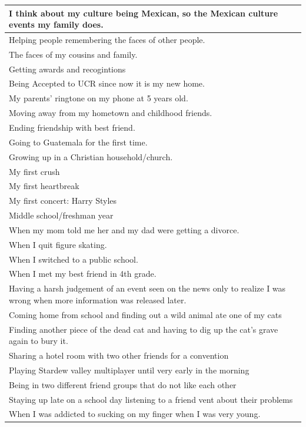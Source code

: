 \documentclass[
  .7em,
  letterpaper,
  DIV=11,
  numbers=noendperiod]{scrartcl}
\begin{document}
\begin{table}
\begin{tabular}{l}
\hline
I think about my culture being Mexican, so the Mexican culture events my family does.\\
\hline
Helping people remembering the faces of other people.\\
\hline
The faces of my cousins and family.\\
\hline
Getting awards and recogintions\\
\hline
Being Accepted to UCR since now it is my new home.\\
\hline
My parents' ringtone on my phone at 5 years old.\\
\hline
Moving away from my hometown and childhood friends.\\
\hline
Ending friendship with best friend.\\
\hline
Going to Guatemala for the first time.\\
\hline
Growing up in a Christian household/church.\\
\hline
My first crush\\
\hline
My first heartbreak\\
\hline
My first concert: Harry Styles\\
\hline
Middle school/freshman year\\
\hline
When my mom told me her and my dad were getting a divorce.\\
\hline
When I quit figure skating.\\
\hline
When I switched to a public school.\\
\hline
When I met my best friend in 4th grade.\\
\hline
Having a harsh judgement of an event seen on the news only to realize I was wrong when more information was released later.\\
\hline
Coming home from school and finding out a wild animal ate one of my cats\\
\hline
Finding another piece of the dead cat and having to dig up the cat's grave again to bury it.\\
\hline
Sharing a hotel room with two other friends for a convention\\
\hline
Playing Stardew valley multiplayer until very early in the morning\\
\hline
Being in two different friend groups that do not like each other\\
\hline
Staying up late on a school day listening to a friend vent about their problems\\
\hline
When I was addicted to sucking on my finger when I was very young.\\

\end{tabular}
\end{table}
\end{document}
